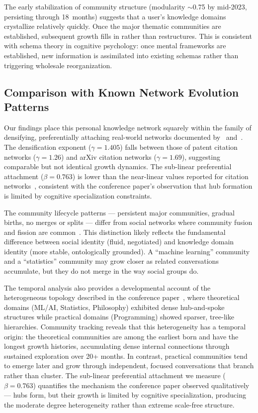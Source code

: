 \documentclass[10pt,letterpaper]{article}
\begin{document}
The early stabilization of community structure (modularity $\sim$0.75 by mid-2023, persisting through 18~months) suggests that a user's knowledge domains crystallize relatively quickly. Once the major thematic communities are established, subsequent growth fills in rather than restructures. This is consistent with schema theory in cognitive psychology: once mental frameworks are established, new information is assimilated into existing schemas rather than triggering wholesale reorganization.

\subsection{Comparison with Known Network Evolution Patterns}
\label{sec:comparison}

Our findings place this personal knowledge network squarely within the family of densifying, preferentially attaching real-world networks documented by~\citet{leskovec2007graph} and~\citet{barabasi1999emergence}. The densification exponent ($\gamma = 1.405$) falls between those of patent citation networks ($\gamma = 1.26$) and arXiv citation networks ($\gamma = 1.69$), suggesting comparable but not identical growth dynamics. The sub-linear preferential attachment ($\beta = 0.763$) is lower than the near-linear values reported for citation networks~\citep{jeong2003measuring}, consistent with the conference paper's observation that hub formation is limited by cognitive specialization constraints.

The community lifecycle patterns --- persistent major communities, gradual births, no merges or splits --- differ from social networks where community fusion and fission are common~\citep{palla2007quantifying}. This distinction likely reflects the fundamental difference between social identity (fluid, negotiated) and knowledge domain identity (more stable, ontologically grounded). A ``machine learning'' community and a ``statistics'' community may grow closer as related conversations accumulate, but they do not merge in the way social groups do.

The temporal analysis also provides a developmental account of the heterogeneous topology described in the conference paper~\citep{towell2025cognitive}, where theoretical domains (ML/AI, Statistics, Philosophy) exhibited dense hub-and-spoke structures while practical domains (Programming) showed sparser, tree-like hierarchies. Community tracking reveals that this heterogeneity has a temporal origin: the theoretical communities are among the earliest born and have the longest growth histories, accumulating dense internal connections through sustained exploration over 20+ months. In contrast, practical communities tend to emerge later and grow through independent, focused conversations that branch rather than cluster. The sub-linear preferential attachment we measure ($\beta = 0.763$) quantifies the mechanism the conference paper observed qualitatively --- hubs form, but their growth is limited by cognitive specialization, producing the moderate degree heterogeneity rather than extreme scale-free structure.
\end{document}
